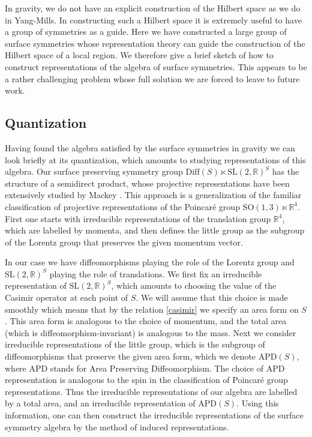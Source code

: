 \documentclass[a4paper,11pt]{article}
\newcommand{\SO}{\text{SO}}
\newcommand{\R}{\mathbb{R}}
\newcommand{\slr}{\text{SL}(2,\mathbb{R})}
\begin{document}
In gravity, we do not have an explicit construction of the Hilbert space as we do in Yang-Mills.
In constructing such a Hilbert space it is extremely useful to have a group of symmetries as a guide.
Here we have constructed a large group of surface symmetries whose representation theory can guide the construction of the Hilbert space of a local region.
We therefore give a brief sketch of how to construct representations of the algebra of surface symmetries.
This appears to be a rather challenging problem whose full solution we are forced to leave to future work.

\subsection{Quantization}

Having found the algebra satisfied by the surface symmetries in gravity we can look briefly at its quantization, which amounts to studying representations of this algebra.
Our surface preserving symmetry group
$\text{Diff}(S) \ltimes \slr^S$ has the structure of a semidirect product, whose projective representations have been extensively studied by Mackey \cite{Mackey1989}.
This approach is a generalization of the familiar classification of projective representations of the Poincar\'e group $\SO(1,3) \ltimes \R^4$.
First one starts with irreducible representations of the translation group $\R^4$, which are labelled by momenta, and then defines the little group as the subgroup of the Lorentz group that preserves the given momentum vector.

In our case we have diffeomorphisms playing the role of the Lorentz group and $\slr^S$ playing the role of translations.
We first fix an irreducible representation of $\slr^S$, which amounts to choosing the value of the Casimir operator at each point of $S$. 
We will assume that this choice is made smoothly which means that by the relation \eqref{casimir} we specify an area form on $S$.
This area form is analogous to the choice of momentum, and the total area (which is diffeomorphism-invariant) is analogous to the mass.
Next we consider irreducible representations of the little group, which is the subgroup of diffeomorphisms that preserve the given area form, which we denote $\text{APD}(S)$, where APD stands for Area Preserving Diffeomorphism.
The choice of APD representation is analogous to the spin in the classification of Poincar\'e group representations.
Thus the irreducible representations of our algebra are labelled by a total area, and an irreducible representation of $\text{APD}(S)$.
Using this information, one can then construct the irreducible representations of the surface symmetry algebra by the method of induced representations.
\end{document}
